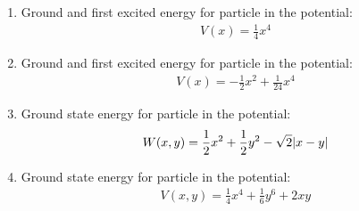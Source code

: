 \documentclass{article}
\theoremstyle{definition}
\newcommand{\f}[2]{\frac{#1}{#2}}
\begin{document}
\begin{enumerate}[label=(\alph*)]
	\item Ground and first excited energy for particle in the potential:
	\begin{align*}
	V(x) = \f{1}{4}x^4
	\end{align*}
	
	\item Ground and first excited energy for particle in the potential:
	\begin{align*}
	V(x) = -\f{1}{2}x^2 + \f{1}{24}x^4
	\end{align*}
	
	
	\item Ground state energy for particle in the potential:
	\begin{align*}
	W(x,y) = \f{1}{2}x^2 + \f{1}{2}y^2 - \sqrt{2}\abs{x-y}
	\end{align*}
	
	
	\item Ground state energy for particle in the potential:
	\begin{align*}
	V(x,y) = \f{1}{4}x^4 + \f{1}{6}y^6 + 2xy
	\end{align*}
\end{enumerate}

	
\end{document}
